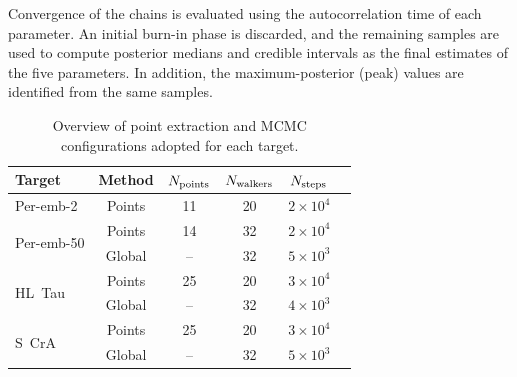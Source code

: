 Convergence of the chains is evaluated using the autocorrelation time of each parameter. An initial burn-in phase is discarded, and the remaining samples are used to compute posterior medians and credible intervals as the final estimates of the five parameters. In addition, the maximum-posterior (peak) values are identified from the same samples.

\begin{table}[h]
\centering
\begin{tabular}{lccccc}
\toprule
\midrule
Target & Method & $N_{\rm points}$ & $N_{\rm walkers}$ & $N_{\rm steps}$ \\
\midrule
\multirow{1}{*}{Per-emb-2}
& Points & 11 & 20 & $2\times10^{4}$ \\
\midrule
\multirow{2}{*}{Per-emb-50}
& Points & 14 & 32 & $2\times10^{4}$ \\
& Global & -- & 32 & $5\times10^{3}$ \\
\midrule
\multirow{2}{*}{HL~Tau}
& Points & 25 & 20 & $3\times10^{4}$ \\
& Global & -- & 32 & $4\times10^{3}$ \\
\midrule
\multirow{2}{*}{S~CrA}
& Points & 25 & 20 & $3\times10^{4}$ \\
& Global & -- & 32 & $5\times10^{3}$ \\
\midrule
\bottomrule
\end{tabular}
\caption{Overview of point extraction and MCMC configurations adopted for each target.}\label{table:MCMC_configuration}
\end{table}




